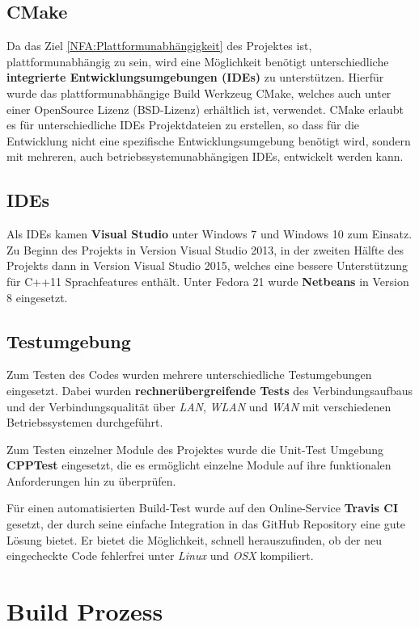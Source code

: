 \subsection{CMake}
Da das Ziel \ref{NFA:Plattformunabhängigkeit} des Projektes ist, plattformunabhängig zu sein, wird eine Möglichkeit benötigt unterschiedliche \textbf{integrierte Entwicklungsumgebungen (IDEs)} zu unterstützen.
Hierfür wurde das plattformunabhängige Build Werkzeug CMake, welches auch unter einer OpenSource Lizenz (BSD-Lizenz) erhältlich ist, verwendet. CMake erlaubt es für unterschiedliche IDEs Projektdateien zu erstellen, so dass für die Entwicklung nicht eine spezifische Entwicklungsumgebung benötigt wird, sondern mit mehreren, auch betriebssystemunabhängigen IDEs, entwickelt werden kann.

\subsection{IDEs}
Als IDEs kamen \textbf{Visual Studio} unter Windows 7 und Windows 10 zum Einsatz. Zu Beginn des Projekts in Version Visual Studio 2013, in der zweiten Hälfte des Projekts dann in Version Visual Studio 2015, welches eine bessere Unterstützung für C++11 Sprachfeatures enthält. Unter Fedora 21 wurde \textbf{Netbeans} in Version 8 eingesetzt.

\subsection{Testumgebung}
Zum Testen des Codes wurden mehrere unterschiedliche Testumgebungen eingesetzt. Dabei wurden \textbf{rechnerübergreifende Tests} des Verbindungsaufbaus und der Verbindungsqualität über \textit{LAN}, \textit{WLAN} und \textit{WAN} mit verschiedenen Betriebssystemen durchgeführt. 

Zum Testen einzelner Module des Projektes wurde die Unit-Test Umgebung \textbf{CPPTest} eingesetzt, die es ermöglicht einzelne Module auf ihre funktionalen Anforderungen hin zu überprüfen. 

Für einen automatisierten Build-Test wurde auf den Online-Service \textbf{Travis CI} gesetzt, der durch seine einfache Integration in das GitHub Repository eine gute Lösung bietet. Er bietet die Möglichkeit, schnell herauszufinden, ob der neu eingecheckte Code fehlerfrei unter \textit{Linux} und \textit{OSX} kompiliert.

\section{Build Prozess}
